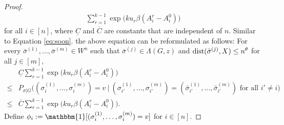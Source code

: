 \documentclass{article}
\begin{document}
\begin{proof}
\begin{align*}
	\sum_{r=1}^{k-1}\exp\big(k u_r \beta (A^r_i-A^0_i) \big)
	\end{align*}
	for all $i\in[n]$, where $\underline{C}$ and $\overline{C}$ are constants that are independent of $n$.
	Similar to Equation \eqref{eq:soon}. the above equation can be reformulated as follows:
	For every $\bar{\sigma}^{(1)},\dots,\bar{\sigma}^{(m)}\in W^n$ such that $\bar{\sigma}^{(j)}\in  \Lambda(G, z)$
	and $\operatorname{dist}(\bar{\sigma}^{(j)}, X) \le n^\theta$
	for all $j\in[m]$,
	\begin{equation} \label{eq:s56}
	\begin{aligned}
	& \underline{C}
	\sum_{r=1}^{k-1}\exp\big(k u_r  \beta (A^r_i-A^0_i) \big) \\
	\le
	& P_{\sigma|G} \big( (\sigma_i^{(1)},\dots,\sigma_i^{(m)})=v ~\big|~ (\sigma_{i'}^{(1)},\dots,\sigma_{i'}^{(m)})= (\bar{\sigma}_{i'}^{(1)},\dots,\bar{\sigma}_{i'}^{(m)}) \text{~for all~} i'\neq i \big) \\
	\le & \overline{C}
	\sum_{r=1}^{k-1}\exp\big(k u_r  \beta (A^r_i-A^0_i) \big).
	\end{aligned}
	\end{equation}
	Define 
	$\phi_i := \mathbbm{1}[(\sigma_i^{(1)},\dots,\sigma_i^{(m)})=v]$ for $i\in[n]$.


\end{proof}
\end{document}
